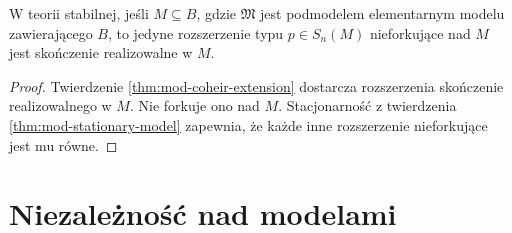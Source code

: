 \begin{wniosek}
\label{cor:mod-stable-coheir-unique}
W teorii stabilnej, jeśli $M\subseteq B$,
gdzie $\mathfrak M$ jest podmodelem elementarnym
modelu zawierającego $B$, to jedyne rozszerzenie
typu $p\in S_n(M)$ nieforkujące nad $M$
jest skończenie realizowalne w $M$.
\end{wniosek}
\begin{proof}
Twierdzenie \ref{thm:mod-coheir-extension}
dostarcza rozszerzenia skończenie realizowalnego
w $M$. Nie forkuje ono nad $M$.
Stacjonarność z twierdzenia
\ref{thm:mod-stationary-model} zapewnia,
że każde inne rozszerzenie nieforkujące
jest mu równe.
\end{proof}

\section{Niezależność nad modelami}

